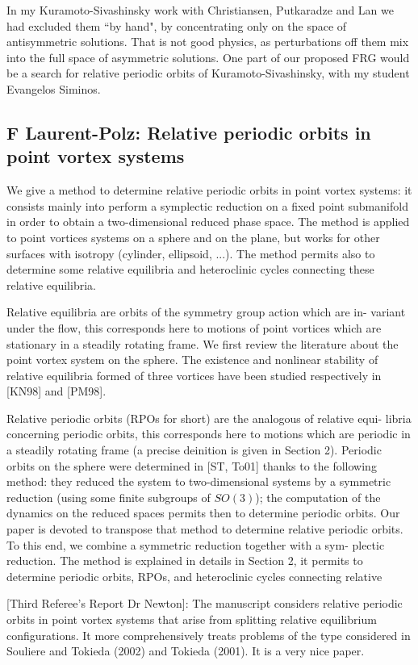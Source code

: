 In my Kuramoto-Sivashinsky work with Christiansen, Putkaradze and Lan we
had excluded them ``by hand", by concentrating only on the space of
antisymmetric solutions. That is not good physics, as perturbations off
them mix into the full space of asymmetric solutions. One part of our
proposed FRG would be a search for relative periodic orbits of
Kuramoto-Sivashinsky, with my student Evangelos Siminos.

\subsection{F Laurent-Polz: Relative periodic orbits in point vortex systems}

We give a method to determine relative periodic orbits in point vortex systems: it consists mainly into perform a symplectic reduction on a fixed point submanifold in order to obtain a two-dimensional reduced phase space. The method is applied to point vortices systems on a sphere and on the plane, but works for other surfaces with isotropy (cylinder, ellipsoid, ...). The method permits also to determine some relative equilibria and heteroclinic cycles connecting these relative equilibria.

    Relative equilibria are orbits of the symmetry group action which are in-
variant under the flow, this corresponds here to motions of point vortices which
are stationary in a steadily rotating frame. We first review the literature about
the point vortex system on the sphere. The existence and nonlinear stability
of relative equilibria formed of three vortices have been studied respectively in
[KN98] and [PM98]. 

    Relative periodic orbits (RPOs for short) are the analogous of relative equi-
libria concerning periodic orbits, this corresponds here to motions which are
periodic in a steadily rotating frame (a precise deinition is given in Section
2). Periodic orbits on the sphere were determined in [ST, To01] thanks to the
following method: they reduced the system to two-dimensional systems by a
symmetric reduction (using some finite subgroups of $SO(3)$); the computation
of the dynamics on the reduced spaces permits then to determine periodic orbits.
Our paper is devoted to transpose that method to determine relative periodic
orbits. To this end, we combine a symmetric reduction together with a sym-
plectic reduction. The method is explained in details in Section 2, it permits
to determine periodic orbits, RPOs, and heteroclinic cycles connecting relative

[Third Referee's Report Dr Newton]:
The manuscript considers relative periodic orbits in point vortex systems
that arise from splitting relative equilibrium configurations. It more
comprehensively treats problems of the type considered in Souliere and
Tokieda (2002) and Tokieda (2001). It is a very nice paper.

